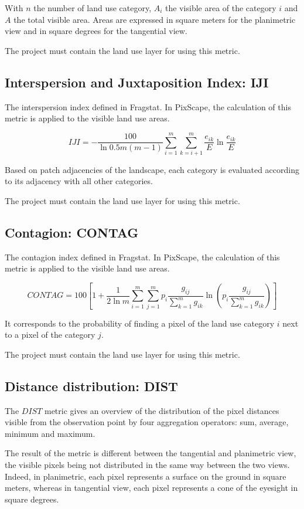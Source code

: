 \documentclass{report}
\begin{document}
With $n$ the number of land use category, $A_i$ the visible area of the category $i$ and $A$ the total visible area. Areas are expressed in square meters for the planimetric view and in square degrees for the tangential view.

The project must contain the land use layer for using this metric.


\subsection{Interspersion and Juxtaposition Index: IJI}
The interspersion index defined in Fragstat. In PixScape, the calculation of this metric is applied to the visible land use areas.

$$ IJI =  -\frac{100}{\ln 0.5 m(m-1)} \sum_{i=1}^{m} \sum_{k=i+1}^{m}     \dfrac{e_{ik}}{E} \ln \dfrac{e_{ik}}{E}$$

Based on patch adjacencies of the landscape, each category is evaluated according to its adjacency with all other categories. 

The project must contain the land use layer for using this metric.

\subsection{Contagion: CONTAG}
The contagion index defined in Fragstat. In PixScape, the calculation of this metric is applied to the visible land use areas.

$$ CONTAG = 100 \left[1+\dfrac{1}{2\ln m} \sum _{i=1}^{m}  \sum _{j=1}^{m}  p_i\dfrac{g_{ij}}{\sum _{k=1}^{m}g_{ik} }   \ln \left( p_i\dfrac{g_{ij}}{\sum _{k=1}^{m}g_{ik} }\right)  \right]$$

It corresponds to the probability of finding a pixel of the land use category $i$
next to a pixel of the category $j$.

The project must contain the land use layer for using this metric.

\subsection{Distance distribution: DIST}

The $DIST$ metric gives an overview of the distribution of the pixel distances visible from the observation point by four aggregation operators: sum, average, minimum and maximum.

The result of the metric is different between the tangential and planimetric view, the visible pixels being not distributed in the same way between the two views. Indeed, in planimetric, each pixel represents a surface on the ground in square meters, whereas in tangential view, each pixel represents a cone of the eyesight in square degrees.
\end{document}
